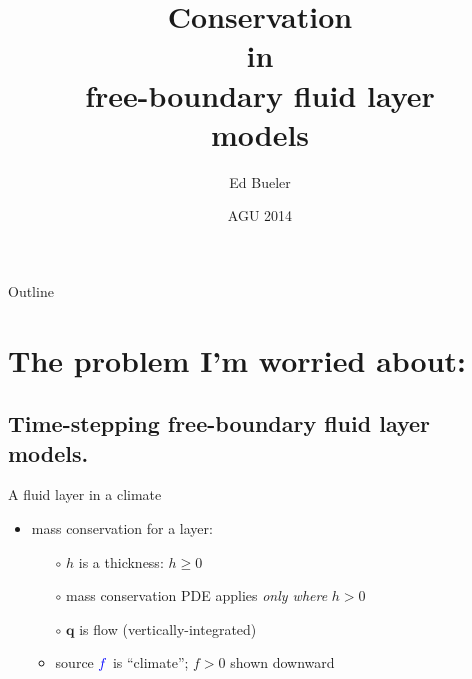 \documentclass{beamer}
\title[Conservation in free-boundary layers] %
{Conservation \\ in \\ free-boundary fluid layer \\ models}
\author{Ed Bueler}
\institute[UAF] %
{
  Dept of Mathematics and Statistics, and Geophysical Institute\\
  University of Alaska Fairbanks%
}
\date{{\scriptsize AGU 2014}}
\newcommand\bq{\mathbf{q}}
\newcommand{\Div}{\nabla\cdot}
\begin{document}
\graphicspath{{../images/}{../../talks-public/commonfigs/}}

\begin{frame}
  \titlepage
\end{frame}

\begin{frame}{Outline}
  \tableofcontents
\end{frame}


\section{The problem I'm worried about:}

\subsection{Time-stepping free-boundary fluid layer models.}

\begin{frame}{A fluid layer in a climate}

\begin{center}
\end{center}

\vspace{-7mm}
  \begin{itemize}
  \item mass conservation for a layer:
     \only<1>{$$h_t + \Div\bq = f$$}
     \only<2>{$$h_t + \Div\bq = {\color{blue} f}$$}
    \begin{itemize}
    \vspace{-4mm}
    \item[$\circ$] $h$ is a thickness: $h\ge 0$
    \item[$\circ$] mass conservation PDE applies \emph{only where} $h>0$
    \item[$\circ$] $\bq$ is flow (vertically-integrated)
    \item<2>[$\circ$] source ${\color{blue} f}$ is ``climate''; $f>0$ shown downward
    \end{itemize}
  \end{itemize}
\end{frame}
\end{document}
